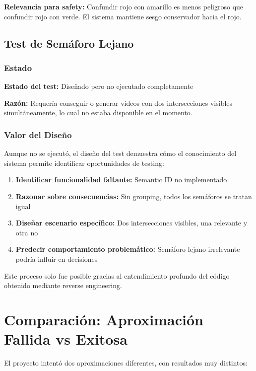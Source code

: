 \textbf{Relevancia para safety:} Confundir rojo con amarillo es menos peligroso que confundir rojo con verde. El sistema mantiene sesgo conservador hacia el rojo.

\subsection{Test de Semáforo Lejano}

\subsubsection{Estado}

\textbf{Estado del test:} Diseñado pero no ejecutado completamente

\textbf{Razón:} Requería conseguir o generar videos con dos intersecciones visibles simultáneamente, lo cual no estaba disponible en el momento.

\subsubsection{Valor del Diseño}

Aunque no se ejecutó, el diseño del test demuestra cómo el conocimiento del sistema permite identificar oportunidades de testing:

\begin{enumerate}
    \item \textbf{Identificar funcionalidad faltante:} Semantic ID no implementado
    \item \textbf{Razonar sobre consecuencias:} Sin grouping, todos los semáforos se tratan igual
    \item \textbf{Diseñar escenario específico:} Dos intersecciones visibles, una relevante y otra no
    \item \textbf{Predecir comportamiento problemático:} Semáforo lejano irrelevante podría influir en decisiones
\end{enumerate}

Este proceso solo fue posible gracias al entendimiento profundo del código obtenido mediante reverse engineering.

\section{Comparación: Aproximación Fallida vs Exitosa}

El proyecto intentó dos aproximaciones diferentes, con resultados muy distintos:


